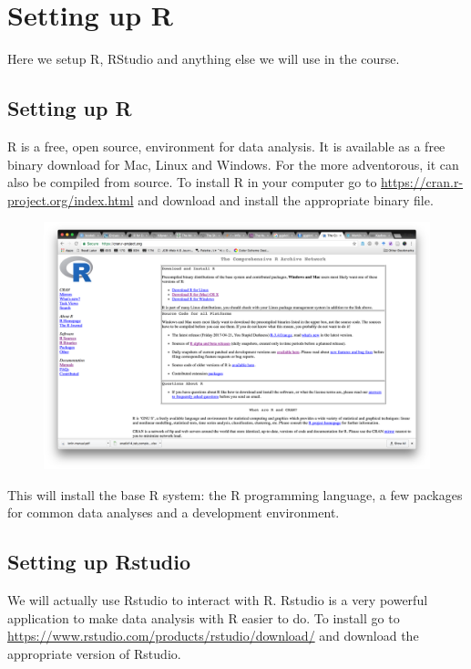\documentclass[]{book}
\theoremstyle{definition}
\theoremstyle{definition}
\theoremstyle{remark}
\begin{document}
\chapter{Setting up R}\label{setting-up-r}

Here we setup R, RStudio and anything else we will use in the course.

\section{Setting up R}\label{setting-up-r-1}

R is a free, open source, environment for data analysis. It is available
as a free binary download for Mac, Linux and Windows. For the more
adventorous, it can also be compiled from source. To install R in your
computer go to \url{https://cran.r-project.org/index.html} and download
and install the appropriate binary file.

\begin{figure}
\centering
\includegraphics{img/cran.png}
\caption{}
\end{figure}

This will install the base R system: the R programming language, a few
packages for common data analyses and a development environment.

\section{Setting up Rstudio}\label{setting-up-rstudio}

We will actually use Rstudio to interact with R. Rstudio is a very
powerful application to make data analysis with R easier to do. To
install go to \url{https://www.rstudio.com/products/rstudio/download/}
and download the appropriate version of Rstudio.
\end{document}
